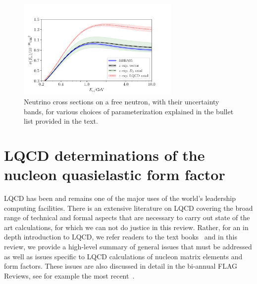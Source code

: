 \documentclass{ar-1col}
\begin{document}
\begin{figure}[hbt!]
 \centering
 \includegraphics[width=0.7\textwidth]{plots/xsec_comparison-standalone.pdf}\vspace{4pt}
\caption{
 Neutrino cross sections on a free neutron, with their uncertainty bands,
 for various choices of parameterization explained in the bullet list provided in the text.
 \label{fig:nucleonxsec}
}
\end{figure}


\section{LQCD determinations of the nucleon quasielastic form factor\label{sec:lqcd}}

LQCD has been and remains one of the major uses of the world's leadership computing facilities.
There is an extensive literature on LQCD covering the broad range of technical and formal aspects that are necessary to carry out state of the art calculations, for which we can not do justice in this review.
Rather, for an in depth introduction to LQCD, we refer readers to the text books~\cite{Smit:2002ug,DeGrand:2006zz,Gattringer:2010zz} and in this review, we provide a high-level summary of general issues that must be addressed as well as issues specific to LQCD calculations of nucleon matrix elements and form factors.
These issues are also discussed in detail in the bi-annual FLAG Reviews, see for example the most recent~\cite{Aoki:2021kgd}.%
\begin{marginnote}
\end{marginnote}
\end{document}
